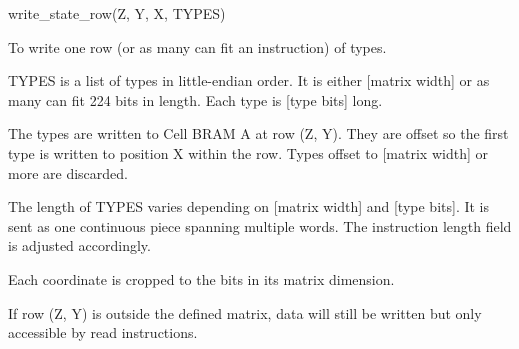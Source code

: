 

\format
write\_state\_row(Z, Y, X, TYPES)

\purpose

To write one row (or as many can fit an instruction) of types.

\description

TYPES is a list of types in little-endian order.
It is either [matrix width] or as many can fit 224 bits in length.
Each type is [type bits] long.

The types are written to Cell BRAM A at row (Z, Y).
They are offset so the first type is written to position X within the row.
Types offset to [matrix width] or more are discarded.

The length of TYPES varies depending on [matrix width] and [type bits].
It is sent as one continuous piece spanning multiple words.
The instruction length field is adjusted accordingly.

\notes

Each coordinate is cropped to the bits in its matrix dimension.

If row (Z, Y) is outside the defined matrix, data will still be written but only accessible by read instructions.

